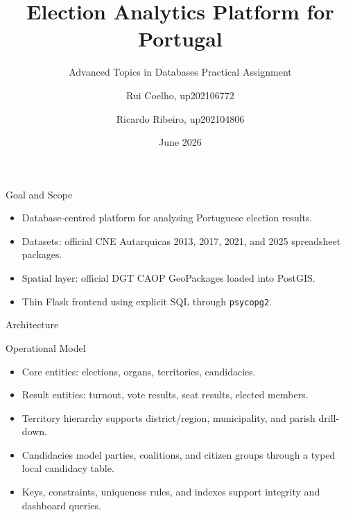 \documentclass[aspectratio=169]{beamer}
\title[Election Analytics Platform]{Election Analytics Platform for Portugal}
\subtitle{Advanced Topics in Databases Practical Assignment}
\author{Rui Coelho, up202106772 \and Ricardo Ribeiro, up202104806}
\date{June 2026}
\begin{document}
\begin{frame}
  \titlepage
\end{frame}

\begin{frame}{Goal and Scope}
  \begin{itemize}
    \item Database-centred platform for analysing Portuguese election results.
    \item Datasets: official CNE Autarquicas 2013, 2017, 2021, and 2025 spreadsheet packages.
    \item Spatial layer: official DGT CAOP GeoPackages loaded into PostGIS.
    \item Thin Flask frontend using explicit SQL through \texttt{psycopg2}.
  \end{itemize}
\end{frame}

\begin{frame}{Architecture}
  \centering
\end{frame}

\begin{frame}{Operational Model}
  \begin{itemize}
    \item Core entities: elections, organs, territories, candidacies.
    \item Result entities: turnout, vote results, seat results, elected members.
    \item Territory hierarchy supports district/region, municipality, and parish drill-down.
    \item Candidacies model parties, coalitions, and citizen groups through a typed local candidacy table.
    \item Keys, constraints, uniqueness rules, and indexes support integrity and dashboard queries.
  \end{itemize}
\end{frame}
\end{document}
